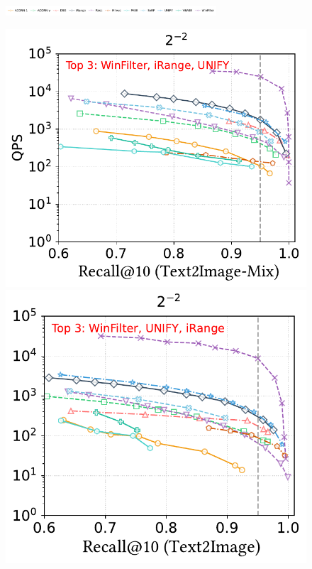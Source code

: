 \documentclass[sigconf, nonacm]{acmart}
\begin{document}
{%
	
\begin{figure}
	\centering
	\includegraphics[width=0.7\textwidth]{figures/exp/range_legend.pdf}
	
	\begin{minipage}[t]{0.38\textwidth}
		\centering
		\includegraphics[width=0.495\linewidth]{figures/exp/range_multimodel.pdf}
		\hfill 
		\includegraphics[width=0.47\linewidth]{figures/exp/range_multimodel_1.pdf}


\end{minipage}
\end{figure}}
\end{document}
